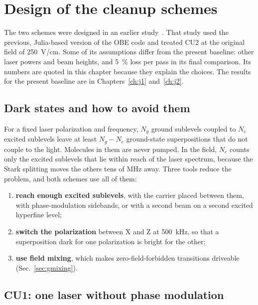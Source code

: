 \documentclass[11pt,a4paper,oneside]{report}
\begin{document}
\chapter{Design of the cleanup schemes}
\label{ch:design}

The two schemes were designed in an earlier study~\cite{CleanupTheory2024}. That study used
the previous, Julia-based version of the OBE code and treated CU2 at the original field of
\SI{250}{V/cm}. Some of its assumptions differ from the present baseline: other laser powers
and beam heights, and \SI{5}{\percent} loss per pass in its final comparison. Its numbers are
quoted in this chapter because they explain the choices. The results for the present baseline
are in Chapters~\ref{ch:j1} and~\ref{ch:j2}.

\section{Dark states and how to avoid them}
\label{sec:darkstates}

For a fixed laser polarization and frequency, $N_g$ ground sublevels coupled to $N_e$ excited
sublevels leave at least $N_g-N_e$ ground-state superpositions that do not couple to the light.
Molecules in them are never pumped. In the field, $N_e$ counts only the excited sublevels
that lie within reach of the laser spectrum, because the Stark splitting moves the others tens
of MHz away. Three tools reduce the problem, and both schemes use all of them:
\begin{enumerate}
  \item \textbf{reach enough excited sublevels}, with the carrier placed between them, with
        phase-modulation sidebands, or with a second beam on a second excited hyperfine level;
  \item \textbf{switch the polarization} between X and Z at \SI{500}{kHz}, so that a
        superposition dark for one polarization is bright for the other;
  \item \textbf{use field mixing}, which makes zero-field-forbidden transitions driveable
        (Sec.~\ref{sec:gmixing}).
\end{enumerate}

\section{CU1: one laser without phase modulation}
\label{sec:design_cu1}
\end{document}
